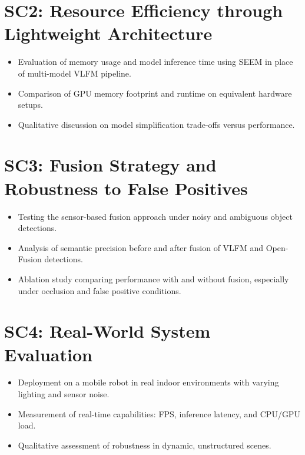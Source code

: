\section{SC2: Resource Efficiency through Lightweight Architecture}
\begin{itemize}
    \item Evaluation of memory usage and model inference time using SEEM in place of multi-model VLFM pipeline.
    \item Comparison of GPU memory footprint and runtime on equivalent hardware setups.
    \item Qualitative discussion on model simplification trade-offs versus performance.
\end{itemize}

\section{SC3: Fusion Strategy and Robustness to False Positives}
\begin{itemize}
    \item Testing the sensor-based fusion approach under noisy and ambiguous object detections.
    \item Analysis of semantic precision before and after fusion of VLFM and Open-Fusion detections.
    \item Ablation study comparing performance with and without fusion, especially under occlusion and false positive conditions.
\end{itemize}

\section{SC4: Real-World System Evaluation}
\begin{itemize}
    \item Deployment on a mobile robot in real indoor environments with varying lighting and sensor noise.
    \item Measurement of real-time capabilities: FPS, inference latency, and CPU/GPU load.
    \item Qualitative assessment of robustness in dynamic, unstructured scenes.
\end{itemize}
